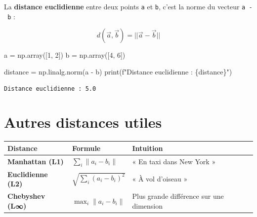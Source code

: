 \documentclass[
  french,
  11pt,
  a4paper,
]{scrbook}
\newenvironment{Shaded}{}{}
\newcommand{\BuiltInTok}[1]{\textcolor[rgb]{0.84,0.23,0.29}{#1}}
\newcommand{\DecValTok}[1]{\textcolor[rgb]{0.00,0.36,0.77}{#1}}
\newcommand{\NormalTok}[1]{\textcolor[rgb]{0.14,0.16,0.18}{#1}}
\newcommand{\OperatorTok}[1]{\textcolor[rgb]{0.14,0.16,0.18}{#1}}
\newcommand{\SpecialCharTok}[1]{\textcolor[rgb]{0.00,0.36,0.77}{#1}}
\newcommand{\SpecialStringTok}[1]{\textcolor[rgb]{0.01,0.18,0.38}{#1}}
\newcounter{none} %
\begin{document}
La \textbf{distance euclidienne} entre deux points \texttt{a} et
\texttt{b}, c'est la norme du vecteur \texttt{a\ -\ b} :

\[d(\vec{a}, \vec{b}) = ||\vec{a} - \vec{b}||\]

\begin{Shaded}
\begin{Highlighting}[]
\NormalTok{a }\OperatorTok{=}\NormalTok{ np.array([}\DecValTok{1}\NormalTok{, }\DecValTok{2}\NormalTok{])}
\NormalTok{b }\OperatorTok{=}\NormalTok{ np.array([}\DecValTok{4}\NormalTok{, }\DecValTok{6}\NormalTok{])}

\NormalTok{distance }\OperatorTok{=}\NormalTok{ np.linalg.norm(a }\OperatorTok{{-}}\NormalTok{ b)}
\BuiltInTok{print}\NormalTok{(}\SpecialStringTok{f"Distance euclidienne : }\SpecialCharTok{\{}\NormalTok{distance}\SpecialCharTok{\}}\SpecialStringTok{"}\NormalTok{)}
\end{Highlighting}
\end{Shaded}

\begin{verbatim}
Distance euclidienne : 5.0
\end{verbatim}

\section{Autres distances utiles}\label{autres-distances-utiles}

{\def\LTcaptype{none} %
\begin{longtable}[]{@{}
  >{\raggedright\arraybackslash}p{}
  >{\raggedright\arraybackslash}p{}
  >{\raggedright\arraybackslash}p{}@{}}
\toprule\noalign{}
\begin{minipage}[b]{\linewidth}\raggedright
Distance
\end{minipage} & \begin{minipage}[b]{\linewidth}\raggedright
Formule
\end{minipage} & \begin{minipage}[b]{\linewidth}\raggedright
Intuition
\end{minipage} \\
\midrule\noalign{}
\endhead
\bottomrule\noalign{}
\endlastfoot
\textbf{Manhattan (L1)} & \(\sum_i \|a_i - b_i\|\) & « En taxi dans New
York » \\
\textbf{Euclidienne (L2)} & \(\sqrt{\sum_i (a_i - b_i)^2}\) & « À vol
d'oiseau » \\
\textbf{Chebyshev (L∞)} & \(\max_i \|a_i - b_i\|\) & Plus grande
différence sur une dimension \\
\end{longtable}
}
\end{document}
